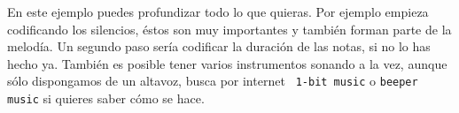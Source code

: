 En este ejemplo puedes profundizar todo lo que quieras. Por ejemplo empieza codificando los
silencios, éstos son muy importantes y también forman parte de la melodía. Un segundo paso sería
codificar la duración de las notas, si no lo has hecho ya. También es posible tener varios
instrumentos sonando a la vez, aunque sólo dispongamos de un altavoz, busca por internet {\tt
1-bit music} o {\tt beeper music} si quieres saber cómo se hace.

\chapterend{}

%
